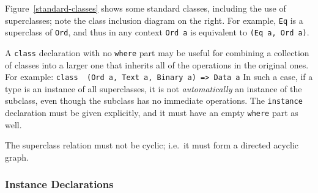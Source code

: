 Figure~\ref{standard-classes} shows some standard \Haskell{}
classes, including the use of superclasses; note the class inclusion
diagram on the right.  For example, \mbox{\tt Eq} is a superclass of \mbox{\tt Ord}, and
thus in any context \mbox{\tt Ord\ a} is equivalent to \mbox{\tt (Eq\ a,\ Ord\ a)}.  

A \mbox{\tt class}
declaration with no \mbox{\tt where} part
may be useful for combining a
collection of classes into a larger one that inherits all of the
operations in the original ones.  For example:
\bprog
\mbox{\tt class\ \ (Ord\ a,\ Text\ a,\ Binary\ a)\ =>\ Data\ a}
\eprog
In such a case, if a type is an instance of all superclasses, it is
not {\em automatically} an instance of the subclass, even though the
subclass has no immediate operations.  The \mbox{\tt instance} declaration must be
given explicitly, and it must have an empty \mbox{\tt where} part as well.

The superclass relation must not be cyclic; i.e.~it must form a
directed acyclic graph.

\subsubsection{Instance Declarations}
\label{instance-decls}

